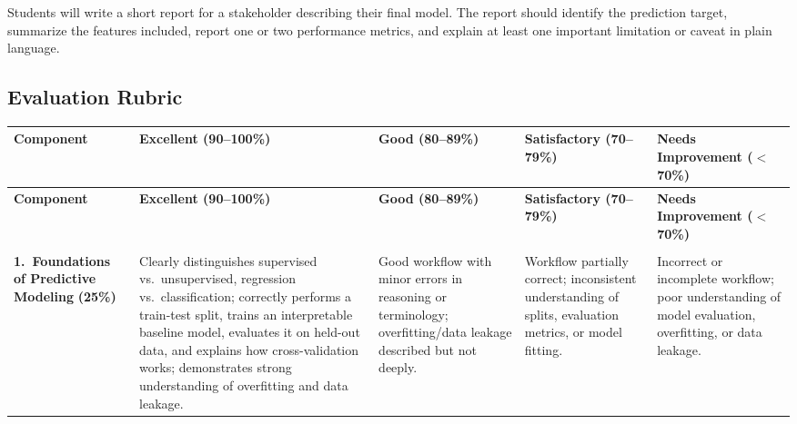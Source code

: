 Students will write a short report for a stakeholder describing their final model. The report should identify the prediction target, summarize the features included, report one or two performance metrics, and explain at least one important limitation or caveat in plain language.


\begin{landscape}

    \section{Evaluation Rubric}

    {\footnotesize

    \begin{longtable}{%
        >{\RaggedRight\arraybackslash}p{2.5cm}   %
        >{\RaggedRight\arraybackslash}p{4.5cm}   %
        >{\RaggedRight\arraybackslash}p{4.2cm}   %
        >{\RaggedRight\arraybackslash}p{4.2cm}   %
        >{\RaggedRight\arraybackslash}p{4.5cm}}  %

    \toprule
    \textbf{Component} &
    \textbf{Excellent (90--100\%)} &
    \textbf{Good (80--89\%)} &
    \textbf{Satisfactory (70--79\%)} &
    \textbf{Needs Improvement ($<$70\%)} \\
    \midrule
    \endfirsthead

    \toprule
    \textbf{Component} &
    \textbf{Excellent (90--100\%)} &
    \textbf{Good (80--89\%)} &
    \textbf{Satisfactory (70--79\%)} &
    \textbf{Needs Improvement ($<$70\%)} \\
    \midrule
    \endhead

    \midrule
    \multicolumn{5}{r}{\textit{Continued on next page}} \\
    \endfoot

    \bottomrule
    \endlastfoot

    \textbf{1.\ Foundations of Predictive Modeling}
    \newline\textbf{(25\%)}
    &
    Clearly distinguishes supervised vs.\ unsupervised, regression
    vs.\ classification; correctly performs a train-test split, trains an
    interpretable baseline model, evaluates it on held-out data, and explains
    how cross-validation works; demonstrates strong understanding of
    overfitting and data leakage.
    &
    Good workflow with minor errors in reasoning or terminology;
    overfitting/data leakage described but not deeply.
    &
    Workflow partially correct; inconsistent understanding of splits,
    evaluation metrics, or model fitting.
    &
    Incorrect or incomplete workflow; poor understanding of model evaluation,
    overfitting, or data leakage.
    \\
    \midrule


\end{longtable}}
\end{landscape}
